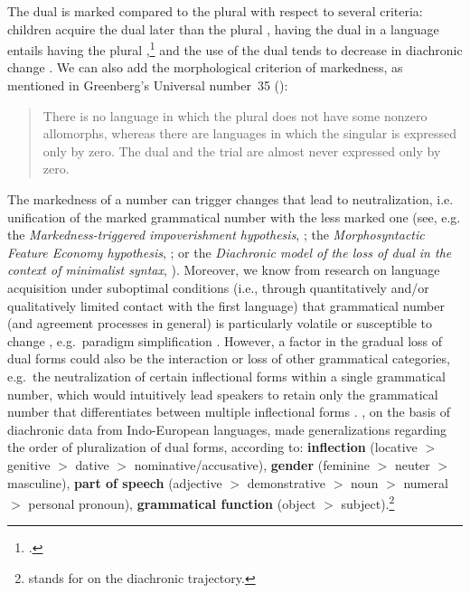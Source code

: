 \documentclass[output=paper,colorlinks,citecolor=brown]{langscibook}
\begin{document}
\noindent The dual is marked compared to the plural with respect to several criteria: children acquire the dual later than the plural \citep{RavidHayek2003}, having the dual in a language entails having the plural \citep%
{Greenberg1963},\footnote{ \citep[94]{Greenberg1963}.}  and the use of the dual tends to decrease in diachronic change \citep{Corbett2000}. We can also add the morphological criterion of markedness, as mentioned in Greenberg's Universal number~35 (\citeyear[94]{Greenberg1963}):

\begin{quote}
There is no language in which the plural does not have some nonzero allomorphs, whereas there are languages in which the singular is expressed only by zero. The dual and the trial are almost never expressed only by zero.
\end{quote}

\noindent The markedness of a number can trigger changes that lead to neutralization, i.e. unification of the marked grammatical number with the less marked one (see, e.g.\, the \textit{Markedness-triggered impoverishment hypothesis}, \citealt{Nevins2011}; the \textit{Morphosyntactic Feature Economy hypothesis}, \citealt{Slobodchikoff2019}; or the \textit{Diachronic model of the loss of dual in the context of minimalist syntax}, \citealt{StepanovStateva2018}). Moreover, we know from research on language acquisition under suboptimal conditions (i.e., through quantitatively and/or qualitatively limited contact with the first language) that grammatical number (and agreement processes in general) is particularly volatile or susceptible to change \citep{Polinsky2018}, e.g.\, paradigm simplification \citep{BerdicevskisSemenuks2022}. However, a factor in the gradual loss of dual forms could also be the interaction or loss of other grammatical categories, e.g.\, the neutralization of certain inflectional forms within a single grammatical number, which would intuitively lead speakers to retain only the grammatical number that differentiates between multiple inflectional forms \citep{Ivanov1983}.
\citet{Tesniere1925}, on the basis of diachronic data from Indo-European languages, made generalizations regarding the order of pluralization of dual forms, according to: \textbf{inflection} (locative $>$ genitive $>$ dative $>$ nominative/accusative), \textbf{gender} (feminine $>$ neuter $>$ masculine), \textbf{part of speech} (adjective $>$ demonstrative $>$ noun $>$ numeral $>$ personal pronoun), \textbf{grammatical function} (object $>$ subject).\footnote{\nn{$>$} stands for  on the diachronic trajectory.}
\end{document}
